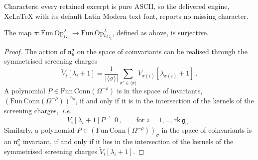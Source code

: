 \documentclass[10pt,a4paper]{amsart}
\newcommand{\ie}{i.e.\ }
\def \ie{{\it i.e.}}
\def\gf{\mathfrak{g}}
\begin{document}
Characters: every retained excerpt is pure ASCII, so the delivered engine, XeLaTeX with its default Latin Modern text font, reports no missing character.
\begin{thm}
The map $\pi:\mathrm{Fun\, Op}_{G_u}^\lambda \rightarrow \mathrm{Fun\, Op}_{^LG_t}^\lambda$, defined as above, is surjective.
\end{thm}

\begin{proof}
The action of $\mathfrak{n}_u^\sigma$ on the space of coinvariants can be realised through the symmetrised screening charges
\begin{equation}
	\tilde{V}_i[\lambda_i +1] = \frac{1}{|\langle \sigma \rangle|} \sum_{\sigma'\in\langle \sigma \rangle} V_{\sigma(i)}[\lambda_{\sigma(i)}+1]~.
\end{equation}
A polynomial $P\in\mathrm{Fun\, Conn}(\Omega^{-\rho})$ is in the space of invariants, $(\mathrm{Fun\, Conn}(\Omega^{-\rho}))^{\mathfrak{n}_u}$, if and only if it is in the intersection of the kernels of the screening charges,~\ie
\begin{equation}
	V_i[\lambda_i +1]P \overset{!}= 0\,,\qquad \text{for } i=1,\dots,\mathrm{rk}\,\gf_u~.
\end{equation}
Similarly, a polynomial $P\in(\mathrm{Fun\, Conn}(\Omega^{-\rho}))_\sigma$ in the space of coinvariants is an $\mathfrak{n}_u^\sigma$ invariant, if and only if it lies in the intersection of the kernels of the symmetrised screening charges $\tilde{V}_i[\lambda_i+1]$.


\end{proof}
\end{document}
